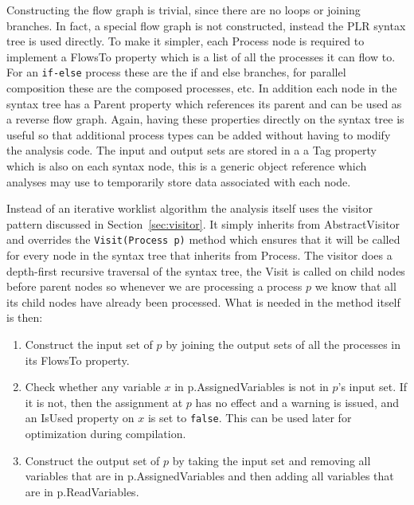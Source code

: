   Constructing the flow graph is trivial, since there are no loops or joining
  branches. In fact, a special flow graph is not constructed, instead the PLR
  syntax tree is used directly. To make it simpler, each \textsf{Process} node
  is required to implement a \textsf{FlowsTo} property which is a list of all
  the processes it can flow to. For an \texttt{if-else} process these are the 
  if and else branches, for parallel composition these are the composed 
  processes, etc. In addition each node in the syntax tree has a \textsf{Parent} 
  property which references its parent and can be used as a reverse flow graph.
  Again, having these properties directly on the syntax tree is useful so
  that additional process types can be added without having to modify the
  analysis code. The input and output sets are stored in a a \textsf{Tag} 
  property which is also on each syntax node, this is a generic object 
  reference which analyses may use to temporarily store data associated with 
  each node.
  
  Instead of an iterative worklist algorithm the analysis itself uses the
  visitor pattern discussed in Section~\ref{sec:visitor}. It simply inherits
  from \textsf{AbstractVisitor} and overrides the \texttt{Visit(Process p)} 
  method which ensures that it will be called for every node in the syntax 
  tree that inherits from \textsf{Process}. The visitor does a depth-first 
  recursive traversal of  the syntax tree, the \textsf{Visit} is called on 
  child nodes before parent nodes so whenever we are processing a process $p$ 
  we know that all its child nodes have already been processed. What is needed
  in the method itself is then:
  
  	\begin{enumerate}
  		\item Construct the input set of $p$ by joining the output sets of all 
  		the processes in its \textsf{FlowsTo} property.

  		\item Check whether any variable $x$ in \textsf{p.AssignedVariables} is 
  		not in $p$'s input set. If it is not, then the assignment at $p$ has no 
  		effect and a warning is issued, and an \textsf{IsUsed} property on $x$ 
  		is set to \texttt{false}. This can be used later for optimization during 
  		compilation.
  		
  		\item Construct the output set of $p$ by taking the input set and 
  		removing all variables that are in \textsf{p.AssignedVariables} and then 
  		adding all variables that are in \textsf{p.ReadVariables}.
  	
  	\end{enumerate}
  
